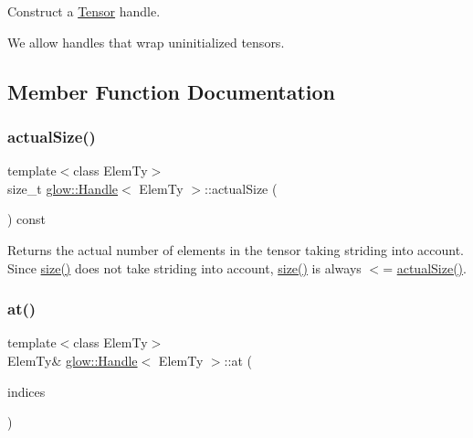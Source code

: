 Construct a \hyperlink{classglow_1_1_tensor}{Tensor} handle. 

We allow handles that wrap uninitialized tensors. 

\subsection{Member Function Documentation}
\mbox{\label{classglow_1_1_handle_a1e2e96d19c373742cc3e667720958097}} 
\subsubsection{\texorpdfstring{actual\+Size()}{actualSize()}}
{\footnotesize\ttfamily template$<$class Elem\+Ty$>$ \\
size\+\_\+t \hyperlink{classglow_1_1_handle}{glow\+::\+Handle}$<$ Elem\+Ty $>$\+::actual\+Size (\begin{DoxyParamCaption}{ }\end{DoxyParamCaption}) const\hspace{0.3cm}{\ttfamily [inline]}}

\begin{DoxyReturn}{Returns}
the actual number of elements in the tensor taking striding into account. Since \hyperlink{classglow_1_1_handle_a7322ebb8b8d2d57f4ea9ec93f238b7a5}{size()} does not take striding into account, \hyperlink{classglow_1_1_handle_a7322ebb8b8d2d57f4ea9ec93f238b7a5}{size()} is always $<$= \hyperlink{classglow_1_1_handle_a1e2e96d19c373742cc3e667720958097}{actual\+Size()}. 
\end{DoxyReturn}
\mbox{\label{classglow_1_1_handle_a4170feefa1d97ce95bbdf7c880811c2b}} 
\subsubsection{\texorpdfstring{at()}{at()}}
{\footnotesize\ttfamily template$<$class Elem\+Ty$>$ \\
Elem\+Ty\& \hyperlink{classglow_1_1_handle}{glow\+::\+Handle}$<$ Elem\+Ty $>$\+::at (\begin{DoxyParamCaption}\item[{llvm\+::\+Array\+Ref$<$ size\+\_\+t $>$}]{indices }\end{DoxyParamCaption})\hspace{0.3cm}{\ttfamily [inline]}}

